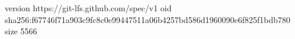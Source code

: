 version https://git-lfs.github.com/spec/v1
oid sha256:f67746f71a903c9fc8c0e99447511a06b4257bd586d1960090e6f825f1bdb780
size 5566
